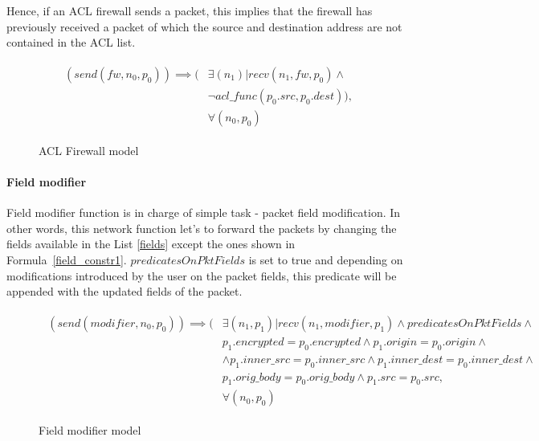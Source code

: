 Hence, if an ACL firewall sends a packet, this implies that the firewall has previously received a packet of which the source and destination address are not contained in the ACL list.
\begin{figure}[h]
	{\footnotesize
		\begin{subequations}
			\begin{align}
				\begin{split}
					\label{acl-fw_constr1}
					(send(fw, n_{0}, p_{0})) \implies (&\exists ( n_{1}) |  recv(n_{1}, fw, p_{0}) \wedge \\
					&\neg acl\_func(p_{0}.src, p_{0}.dest)), \\
					& \forall (n_{0}, p_{0})
				\end{split}
			\end{align}
		\end{subequations}
	}%
	\caption{ACL Firewall model}
	\label{acl-fw_model}
\end{figure}


\paragraph{Field modifier}
Field modifier function is in charge of simple task - packet field modification. In other words, this network function let's to forward the packets by changing the fields available in the List \ref{fields} except the ones shown in Formula~\ref{field_constr1}. $predicatesOnPktFields$ is set to true and depending on modifications introduced by the user on the packet fields, this predicate will be appended with the updated fields of the packet. 
\begin{figure}[h]
	{\footnotesize
		\begin{subequations}
			\begin{align}
				\begin{split}
					\label{field_constr1}
					(send(modifier, n_{0}, p_{0})) \implies (&\exists ( n_{1}, p_{1}) |  recv(n_{1}, modifier, p_{1}) \wedge predicatesOnPktFields \wedge \\
					&   p_{1}.encrypted = p_{0}.encrypted \wedge p_{1}.origin = p_{0}.origin \wedge \\  
					&  \wedge  p_{1}.inner\_src = p_{0}.inner\_src \wedge p_{1}.inner\_dest = p_{0}.inner\_dest \wedge \\
					& p_{1}.orig\_body = p_{0}.orig\_body \wedge p_{1}.src = p_{0}.src,\\
					& \forall (n_{0}, p_{0})
				\end{split}
			\end{align}
		\end{subequations}
	}%
	\caption{Field modifier model}
	\label{field_model}
\end{figure}

